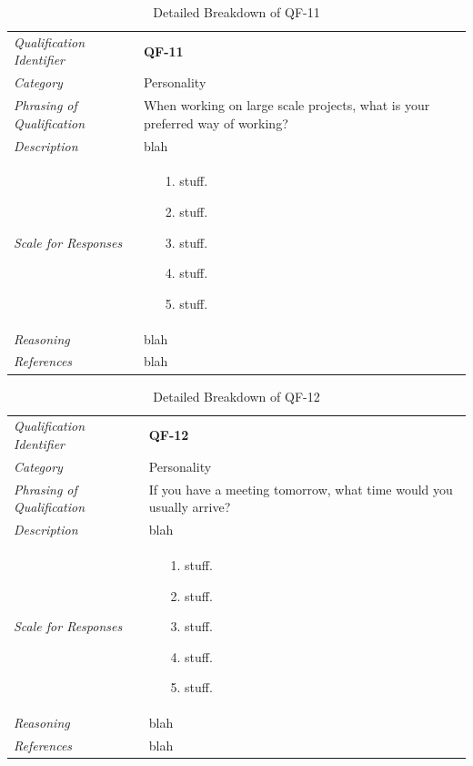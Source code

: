 \documentclass[12pt,letterpaper]{article}
\begin{document}
\begin{table}[H]
	\caption{Detailed Breakdown of QF-11}
	\begin{tabu} to 
		\toprule
		Qualification Identifier & {\bf QF-11}\\
		Category & Personality \\
		Phrasing of Qualification & When working on large scale projects, what is your preferred way of working? \\
		Description & blah\\
		Scale for Responses &
		\begin{minipage}[t]{\linewidth}
			\begin{enumerate}
				\item[1.] stuff.
				\item[2.] stuff.
				\item[3.] stuff.
				\item[4.] stuff.
				\item[5.] stuff.
			\end{enumerate}
		\end{minipage}\\
		Reasoning & blah\\
		References & blah\\
		\toprule
	\end{tabu}
\end{table}

\begin{table}[H]
	\caption{Detailed Breakdown of QF-12}
	\begin{tabu} to 
		\toprule
		Qualification Identifier & {\bf QF-12}\\
		Category & Personality \\
		Phrasing of Qualification & If you have a meeting tomorrow, what time would you usually arrive? \\
		Description & blah\\
		Scale for Responses &
		\begin{minipage}[t]{\linewidth}
			\begin{enumerate}
				\item[1.] stuff.
				\item[2.] stuff.
				\item[3.] stuff.
				\item[4.] stuff.
				\item[5.] stuff.
			\end{enumerate}
		\end{minipage}\\
		Reasoning & blah\\
		References & blah\\
		\toprule
	\end{tabu}
\end{table}
\end{document}

